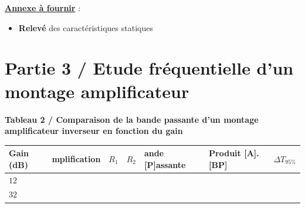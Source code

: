 \medskip

\noindent
\underline{\textbf{Annexe à fournir}} : 
\begin{itemize}[label=$\square$]
	\item \textbf{Relevé} des caractéristiques statiques 
\end{itemize}
 
\medskip

\noindent
\begin{minipage}{0.23\linewidth}
\end{minipage}
\hfill
\begin{minipage}{0.23\linewidth}
\end{minipage}
\hfill
\begin{minipage}{0.23\linewidth}
\end{minipage}
\hfill
\begin{minipage}{0.23\linewidth}
\end{minipage}



\clearpage
\section{Partie 3 / Etude fréquentielle d'un montage amplificateur}

\textbf{Tableau 2 / Comparaison de la bande passante d'un montage amplificateur inverseur en fonction du gain}


\medskip

\begin{center}
\begin{tabular}{|>{\centering\arraybackslash}p{2cm}|>{\centering\arraybackslash}p{3cm}|>{\centering\arraybackslash}p{1.5cm}|>{\centering\arraybackslash}p{1.5cm}|>{\centering\arraybackslash}p{2.2cm}|>{\centering\arraybackslash}p{2.2cm}|>{\centering\arraybackslash}p{2cm}|}
  \hline
  Gain (dB) & [A]mplification & $R_1$ & $R_2$ & [B]ande [P]assante & Produit [A].[BP] & $\Delta{}T_{95\%}$\\
  \hline
  $12$ &  &  &  & & & \rule{0pt}{1.8em} \\
  \hline
  $32$ &  &  &  & & & \rule{0pt}{1.8em} \\
  \hline
\end{tabular}
\end{center}

